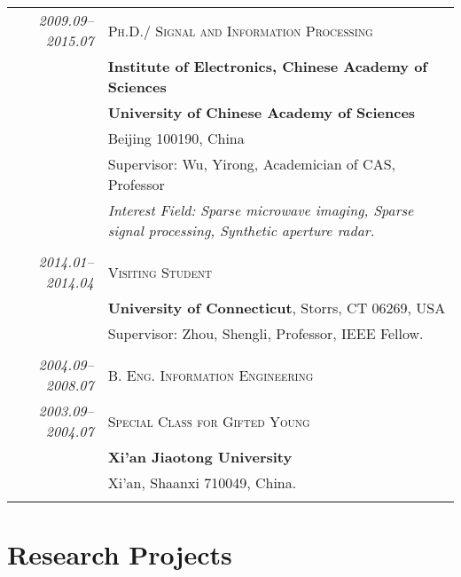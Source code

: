\documentclass[paper=a4,fontsize=11pt]{scrartcl}
\begin{document}
\begin{tabular}{r|p{12cm}}	
	\emph{2009.09--2015.07} & \textsc{Ph.D.}/ \textsc{Signal and Information Processing} \\
	& \normalsize\textbf{Institute of Electronics, Chinese Academy of Sciences} \\
	& \normalsize\textbf{University of Chinese Academy of Sciences}\\
	& Beijing 100190, China\\
	& Supervisor: Wu, Yirong, Academician of CAS, Professor \\
	& \emph{Interest Field: Sparse microwave imaging, Sparse signal processing, Synthetic aperture radar.} \\

	\multicolumn{2}{c}{} \\
		
	
	\emph{2014.01--2014.04} & \textsc{Visiting Student}\\
	& \normalsize\textbf{University of Connecticut}, Storrs, CT 06269, USA\\
	& Supervisor: Zhou, Shengli, Professor, IEEE Fellow. \\
	\multicolumn{2}{c}{} \\


	\emph{2004.09--2008.07} & \textsc{B. Eng.} \textsc{Information Engineering} \\
		\emph{2003.09--2004.07} & \textsc{Special Class for Gifted Young} \\
	& \normalsize\textbf{Xi'an Jiaotong University} \\
	& Xi'an, Shaanxi 710049, China.\\
	\multicolumn{2}{c}{}
%	
%	




\end{tabular}


\section*{Research Projects}
\end{document}
